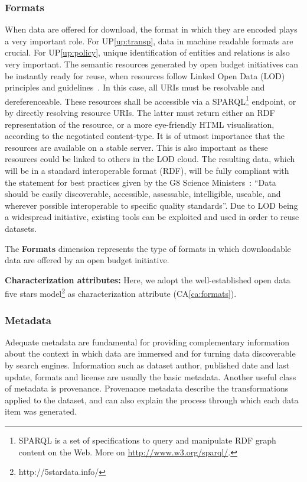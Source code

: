 	\subsubsection{Formats}
When data are offered for download, the format in which they are encoded plays a very important role. For UP\ref{up:transp}, data in machine readable formats are crucial. 
For UP\ref{up:policy}, unique identification of entities and relations is also very important. 
The semantic resources generated by open budget initiatives can be instantly ready for reuse, when resources follow Linked Open Data (LOD) principles and guidelines~\cite{_linked_2011}. 
In this case, all URIs must be resolvable and dereferenceable. These resources shall be accessible via a SPARQL\footnote{SPARQL is a set of specifications to query and manipulate RDF graph content on the Web. More on \url{http://www.w3.org/sparql/}.} endpoint, or by directly resolving resource URIs.
The latter must return either an RDF representation of the resource, or a more eye-friendly HTML visualisation, according to the negotiated content-type. 
It is of utmost importance that the resources are available on a stable server. 
This is also important as these resources could be linked to others in the LOD cloud. 
The resulting data, which will be in a standard interoperable format (RDF), will be fully compliant with the statement for best practices given by the G8 Science Ministers~\cite{RoyalSociety2013}: ``Data should be easily discoverable, accessible, assessable, intelligible, useable, and wherever possible interoperable to specific quality standards''. 
Due to LOD being a widespread initiative, existing tools can be exploited and used in order to reuse datasets.

		\begin{defn}The \textbf{Formats} dimension represents the type of formats in which downloadable data are offered by an open budget initiative.
		\end{defn}
		\noindent\textbf{Characterization attributes:}
Here, we adopt the well-established open data five stars model\footnote{http://5stardata.info/} as characterization attribute (CA\ref{ca:formats}). 

\vspace{.1cm}
	\subsubsection{Metadata}
Adequate metadata are fundamental for providing complementary information about the context in which data are immersed and for turning data discoverable by search engines. 
Information such as dataset author, published date and last update, formats and license are usually the basic metadata. 
Another useful class of metadata is provenance. 
Provenance metadata describe the transformations applied to the dataset, and can also explain the process through which each data item was generated.


